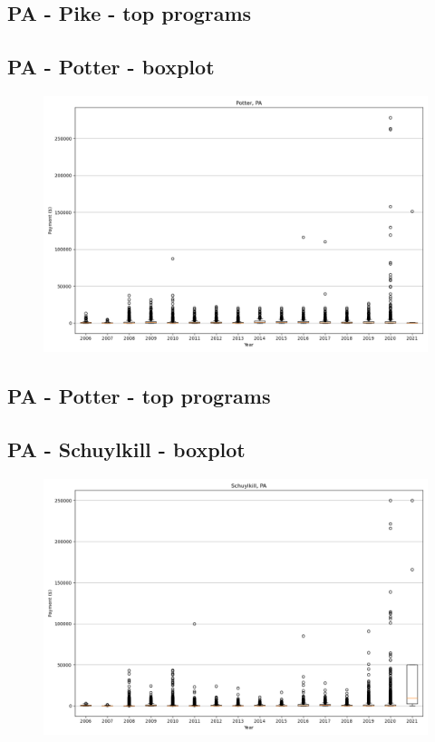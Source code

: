 \subsection*{PA - Pike - top programs}

\newpage
\subsection*{PA - Potter - boxplot}
\begin{figure}[h]
\centering
\includegraphics[width=7in]{../output/boxplots/counties/Potter-PA_boxplot.png}
\end{figure}


\subsection*{PA - Potter - top programs}

\newpage
\subsection*{PA - Schuylkill - boxplot}
\begin{figure}[h]
\centering
\includegraphics[width=7in]{../output/boxplots/counties/Schuylkill-PA_boxplot.png}
\end{figure}


